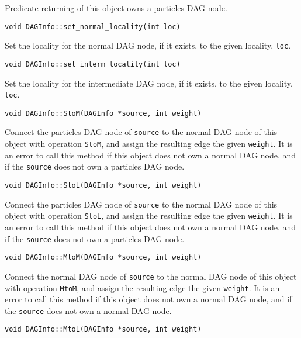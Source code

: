 \noindent Predicate returning of this object owns a particles DAG node.

\begin{lstlisting}
void DAGInfo::set_normal_locality(int loc)
\end{lstlisting}

\noindent Set the locality for the normal DAG node, if it exists, to the given
locality, \texttt{loc}.

\begin{lstlisting}
void DAGInfo::set_interm_locality(int loc)
\end{lstlisting}

\noindent Set the locality for the intermediate DAG node, if it exists, to
the given locality, \texttt{loc}.

\begin{lstlisting}
void DAGInfo::StoM(DAGInfo *source, int weight)
\end{lstlisting}

\noindent Connect the particles DAG node of \texttt{source} to the normal DAG
node of this object with operation \texttt{StoM}, and assign the resulting
edge the given \texttt{weight}. It is an error to call this method if this
object does not own a normal DAG node, and if the \texttt{source} does not
own a particles DAG node.

\begin{lstlisting}
void DAGInfo::StoL(DAGInfo *source, int weight)
\end{lstlisting}

\noindent Connect the particles DAG node of \texttt{source} to the normal DAG
node of this object with operation \texttt{StoL}, and assign the resulting
edge the given \texttt{weight}. It is an error to call this method if this
object does not own a normal DAG node, and if the \texttt{source} does not
own a particles DAG node.

\begin{lstlisting}
void DAGInfo::MtoM(DAGInfo *source, int weight)
\end{lstlisting}

\noindent Connect the normal DAG node of \texttt{source} to the normal DAG
node of this object with operation \texttt{MtoM}, and assign the resulting
edge the given \texttt{weight}. It is an error to call this method if this
object does not own a normal DAG node, and if the \texttt{source} does not
own a normal DAG node.

\begin{lstlisting}
void DAGInfo::MtoL(DAGInfo *source, int weight)
\end{lstlisting}

